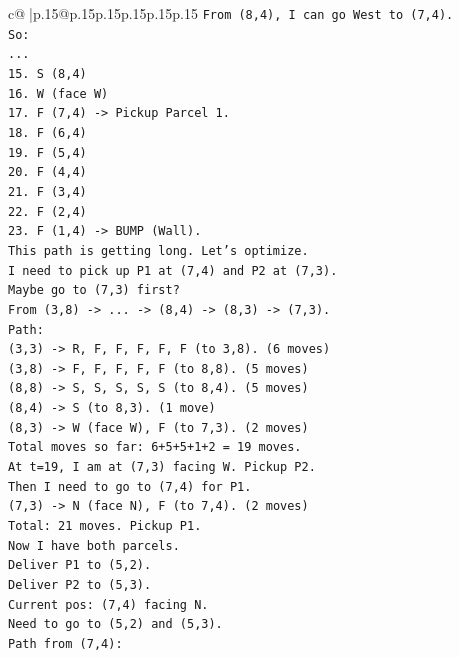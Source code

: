 \documentclass{article}
\begin{document}
{\begin{supertabular}{c@{$\;$}|p{.15\linewidth}@{}p{.15\linewidth}p{.15\linewidth}p{.15\linewidth}p{.15\linewidth}p{.15\linewidth}}
{{{\texttt{From (8,4), I can go West to (7,4).} \\
\texttt{So:} \\
\texttt{...} \\
\texttt{15. S (8,4)} \\
\texttt{16. W (face W)} \\
\texttt{17. F (7,4) {-}> Pickup Parcel 1.} \\
\texttt{18. F (6,4)} \\
\texttt{19. F (5,4)} \\
\texttt{20. F (4,4)} \\
\texttt{21. F (3,4)} \\
\texttt{22. F (2,4)} \\
\texttt{23. F (1,4) {-}> BUMP (Wall).} \\
\texttt{This path is getting long. Let's optimize.} \\
\texttt{I need to pick up P1 at (7,4) and P2 at (7,3).} \\
\texttt{Maybe go to (7,3) first?} \\
\texttt{From (3,8) {-}> ... {-}> (8,4) {-}> (8,3) {-}> (7,3).} \\
\texttt{Path:} \\
\texttt{(3,3) {-}> R, F, F, F, F, F (to 3,8). (6 moves)} \\
\texttt{(3,8) {-}> F, F, F, F, F (to 8,8). (5 moves)} \\
\texttt{(8,8) {-}> S, S, S, S, S (to 8,4). (5 moves)} \\
\texttt{(8,4) {-}> S (to 8,3). (1 move)} \\
\texttt{(8,3) {-}> W (face W), F (to 7,3). (2 moves)} \\
\texttt{Total moves so far: 6+5+5+1+2 = 19 moves.} \\
\texttt{At t=19, I am at (7,3) facing W. Pickup P2.} \\
\texttt{Then I need to go to (7,4) for P1.} \\
\texttt{(7,3) {-}> N (face N), F (to 7,4). (2 moves)} \\
\texttt{Total: 21 moves. Pickup P1.} \\
\texttt{Now I have both parcels.} \\
\texttt{Deliver P1 to (5,2).} \\
\texttt{Deliver P2 to (5,3).} \\
\texttt{Current pos: (7,4) facing N.} \\
\texttt{Need to go to (5,2) and (5,3).} \\
\texttt{Path from (7,4):} \\
}}}
\end{supertabular}}
\end{document}
